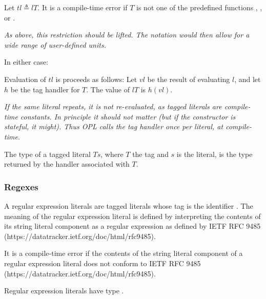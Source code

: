 \documentclass{article}
\begin{document}
Let $tl \triangleq lT$.
It is a compile-time error if $T$ is not one of the predefined functions \MILLISECOND, \SECOND, \MINUTE{} or \HOUR.

{\it
As above, this restriction should be lifted. The notation would then allow for a wide range of user-defined units.
}


In either case:

Evaluation of $tl$ is proceeds as follows:
Let $vl$ be the result of evaluating $l$, and let $h$ be the tag handler for $T$. The value of $lT$ is $h(vl)$.

{\em
If the same literal repeats, it is not re-evaluated, as tagged literals are compile-time constants. In principle it should not matter (but if the constructor is stateful, it might). Thus OPL calls the tag handler once per literal, at compile-time.
}

The type of a tagged literal $Ts$, where $T$ the tag and $s$ is the literal, is the type returned by the handler associated with $T$.



\subsubsection{Regexes}
\label{regexes}

A regular expression literals are tagged literals whose tag is the identifier \REGEXTAG. The meaning of the regular expression literal is defined by interpreting the contents of its string literal component as a regular expression as defined by IETF RFC 9485 (https://datatracker.ietf.org/doc/html/rfc9485).


It is a compile-time error if the  contents of the string literal component of a regular expression literal does not conform to IETF RFC 9485 (https://datatracker.ietf.org/doc/html/rfc9485).

Regular expression literals have type \REGEX [\ref{regexp}].
\end{document}
